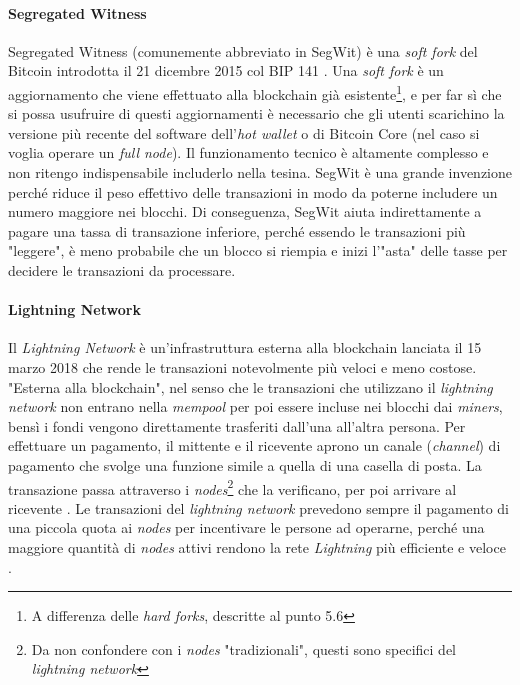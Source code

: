 \documentclass {article}
\begin{document}
\paragraph {Segregated Witness}

Segregated Witness (comunemente abbreviato in SegWit) è una \textit{soft fork} del Bitcoin introdotta il 21 dicembre 2015 col BIP 141 \cite{bip141}.
Una \textit{soft fork} è un aggiornamento che viene effettuato alla blockchain già esistente\footnote{A differenza delle \textit{hard forks}, descritte al punto 5.6}, e per far sì che si possa usufruire di questi aggiornamenti è necessario che gli utenti scarichino la versione più recente del software dell'\textit{hot wallet} o di Bitcoin Core (nel caso si voglia operare un \textit{full node}).
Il funzionamento tecnico è altamente complesso e non ritengo indispensabile includerlo nella tesina.
SegWit è una grande invenzione perché riduce il peso effettivo delle transazioni in modo da poterne includere un numero maggiore nei blocchi.
Di conseguenza, SegWit aiuta indirettamente a pagare una tassa di transazione inferiore, perché essendo le transazioni più "leggere", è meno probabile che un blocco si riempia e inizi l'"asta" delle tasse per decidere le transazioni da processare.

\paragraph {Lightning Network}

Il \textit{Lightning Network} è un'infrastruttura esterna alla blockchain lanciata il 15 marzo 2018 \cite{lightninglaunch} che rende le transazioni notevolmente più veloci e meno costose.
"Esterna alla blockchain", nel senso che le transazioni che utilizzano il \textit{lightning network} non entrano nella \textit{mempool} per poi essere incluse nei blocchi dai \textit{miners}, bensì i fondi vengono direttamente trasferiti dall'una all'altra persona.
Per effettuare un pagamento, il mittente e il ricevente aprono un canale (\textit{channel}) di pagamento che svolge una funzione simile a quella di una casella di posta.
La transazione passa attraverso i \textit{nodes}\footnote{Da non confondere con i \textit{nodes} "tradizionali", questi sono specifici del \textit{lightning network}} che la verificano, per poi arrivare al ricevente \cite{lnhow}.
Le transazioni del \textit{lightning network} prevedono sempre il pagamento di una piccola quota ai \textit{nodes} per incentivare le persone ad operarne, perché una maggiore quantità di \textit{nodes} attivi rendono la rete \textit{Lightning} più efficiente e veloce \cite{lnfees}.
\end{document}
